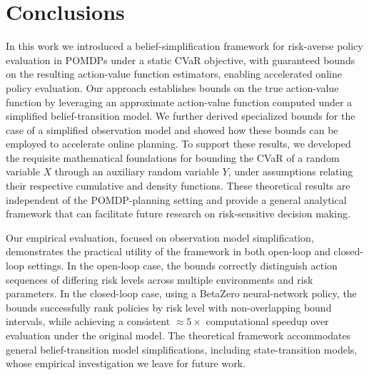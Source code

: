 \documentclass[acmlarge, manuscript, screen, review, natbib=false, oneside]{acmart}
\begin{document}
\section{Conclusions}
In this work we introduced a belief-simplification framework for risk-averse policy evaluation in POMDPs under a static CVaR objective, with guaranteed bounds on the resulting action-value function estimators, enabling accelerated online policy evaluation. Our approach establishes bounds on the true action-value function by leveraging an approximate action-value function computed under a simplified belief-transition model. We further derived specialized bounds for the case of a simplified observation model and showed how these bounds can be employed to accelerate online planning. To support these results, we developed the requisite mathematical foundations for bounding the CVaR of a random variable $X$ through an auxiliary random variable $Y$, under assumptions relating their respective cumulative and density functions. These theoretical results are independent of the POMDP-planning setting and provide a general analytical framework that can facilitate future research on risk-sensitive decision making.

Our empirical evaluation, focused on observation model simplification, demonstrates the practical utility of the framework in both open-loop and closed-loop settings. In the open-loop case, the bounds correctly distinguish action sequences of differing risk levels across multiple environments and risk parameters. In the closed-loop case, using a BetaZero neural-network policy, the bounds successfully rank policies by risk level with non-overlapping bound intervals, while achieving a consistent ${\approx}5\times$ computational speedup over evaluation under the original model. The theoretical framework accommodates general belief-transition model simplifications, including state-transition models, whose empirical investigation we leave for future work.

\printbibliography

\newpage
\appendix
\end{document}

